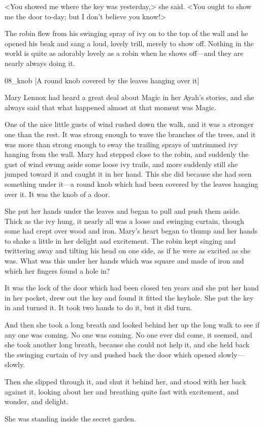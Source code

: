 <You showed me where the key was yesterday,> she said. <You ought to show me the door to-day; but I don't believe you know!>

The robin flew from his swinging spray of ivy on to the top of the wall and he opened his beak and sang a loud, lovely trill, merely to show off. Nothing in the world is quite as adorably lovely as a robin when he shows off—and they are nearly always doing it.

\begin{colorbigpic}
	[\basicscale]
	{08_knob}
	[A round knob covered by the leaves hanging over it]
\end{colorbigpic}

Mary Lennox had heard a great deal about Magic in her Ayah's stories, and she always said that what happened almost at that moment was Magic.

One of the nice little gusts of wind rushed down the walk, and it was a stronger one than the rest. It was strong enough to wave the branches of the trees, and it was more than strong enough to sway the trailing sprays of untrimmed ivy hanging from the wall. Mary had stepped close to the robin, and suddenly the gust of wind swung aside some loose ivy trails, and more suddenly still she jumped toward it and caught it in her hand. This she did because she had seen something under it—a round knob which had been covered by the leaves hanging over it. It was the knob of a door.



She put her hands under the leaves and began to pull and push them aside. Thick as the ivy hung, it nearly all was a loose and swinging curtain, though some had crept over wood and iron. Mary's heart began to thump and her hands to shake a little in her delight and excitement. The robin kept singing and twittering away and tilting his head on one side, as if he were as excited as she was. What was this under her hands which was square and made of iron and which her fingers found a hole in?

It was the lock of the door which had been closed ten years and she put her hand in her pocket, drew out the key and found it fitted the keyhole. She put the key in and turned it. It took two hands to do it, but it did turn.

And then she took a long breath and looked behind her up the long walk to see if any one was coming. No one was coming. No one ever did come, it seemed, and she took another long breath, because she could not help it, and she held back the swinging curtain of ivy and pushed back the door which opened slowly—slowly.

Then she slipped through it, and shut it behind her, and stood with her back against it, looking about her and breathing quite fast with excitement, and wonder, and delight.

She was standing inside the secret garden.